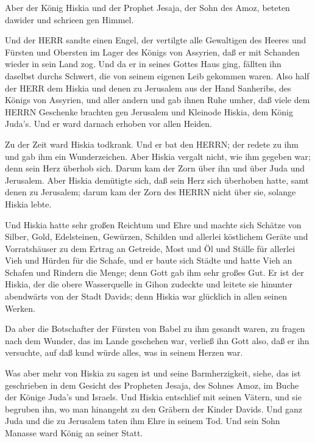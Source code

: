 Aber der König Hiskia und der Prophet Jesaja, der Sohn des
Amoz, beteten dawider und schrieen gen Himmel.

 Und der HERR sandte einen Engel, der vertilgte alle
Gewaltigen des Heeres und Fürsten und Obersten im Lager des Königs von
Assyrien, daß er mit Schanden wieder in sein Land zog. Und da er in
seines Gottes Haus ging, fällten ihn daselbst durchs Schwert, die von
seinem eigenen Leib gekommen waren.  Also half der HERR dem
Hiskia und denen zu Jerusalem aus der Hand Sanheribs, des Königs von
Assyrien, und aller andern und gab ihnen Ruhe umher,  daß
viele dem HERRN Geschenke brachten gen Jerusalem und Kleinode Hiskia,
dem König Juda's. Und er ward darnach erhoben vor allen Heiden.

 Zu der Zeit ward Hiskia todkrank. Und er bat den HERRN;
der redete zu ihm und gab ihm ein Wunderzeichen.  Aber
Hiskia vergalt nicht, wie ihm gegeben war; denn sein Herz überhob sich.
Darum kam der Zorn über ihn und über Juda und Jerusalem. 
Aber Hiskia demütigte sich, daß sein Herz sich überhoben hatte, samt
denen zu Jerusalem; darum kam der Zorn des HERRN nicht über sie, solange
Hiskia lebte.

 Und Hiskia hatte sehr großen Reichtum und Ehre und machte
sich Schätze von Silber, Gold, Edelsteinen, Gewürzen, Schilden und
allerlei köstlichem Geräte  und Vorratshäuser zu dem Ertrag
an Getreide, Most und Öl und Ställe für allerlei Vieh und Hürden für die
Schafe,  und er baute sich Städte und hatte Vieh an Schafen
und Rindern die Menge; denn Gott gab ihm sehr großes Gut. 
Er ist der Hiskia, der die obere Wasserquelle in Gihon zudeckte und
leitete sie hinunter abendwärts von der Stadt Davids; denn Hiskia war
glücklich in allen seinen Werken.

 Da aber die Botschafter der Fürsten von Babel zu ihm
gesandt waren, zu fragen nach dem Wunder, das im Lande geschehen war,
verließ ihn Gott also, daß er ihn versuchte, auf daß kund würde alles,
was in seinem Herzen war.

 Was aber mehr von Hiskia zu sagen ist und seine
Barmherzigkeit, siehe, das ist geschrieben in dem Gesicht des Propheten
Jesaja, des Sohnes Amoz, im Buche der Könige Juda's und Israels.
 Und Hiskia entschlief mit seinen Vätern, und sie begruben
ihn, wo man hinangeht zu den Gräbern der Kinder Davids. Und ganz Juda
und die zu Jerusalem taten ihm Ehre in seinem Tod. Und sein Sohn Manasse
ward König an seiner Statt.

